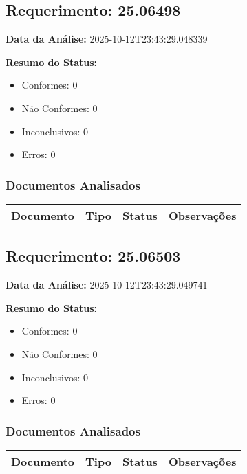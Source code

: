 \documentclass[12pt,a4paper]{article}
\begin{document}
\subsection{Requerimento: 25.06498}

\textbf{Data da Análise:} 2025-10-12T23:43:29.048339

\textbf{Resumo do Status:}
\begin{itemize}
    \item Conformes: 0
    \item Não Conformes: 0
    \item Inconclusivos: 0
    \item Erros: 0
\end{itemize}

\subsubsection{Documentos Analisados}

\begin{longtable}{|p{4cm}|p{2cm}|p{2cm}|p{6cm}|}
\hline
\textbf{Documento} & \textbf{Tipo} & \textbf{Status} & \textbf{Observações} \\
\hline
\endhead
\end{longtable}


\subsection{Requerimento: 25.06503}

\textbf{Data da Análise:} 2025-10-12T23:43:29.049741

\textbf{Resumo do Status:}
\begin{itemize}
    \item Conformes: 0
    \item Não Conformes: 0
    \item Inconclusivos: 0
    \item Erros: 0
\end{itemize}

\subsubsection{Documentos Analisados}

\begin{longtable}{|p{4cm}|p{2cm}|p{2cm}|p{6cm}|}
\hline
\textbf{Documento} & \textbf{Tipo} & \textbf{Status} & \textbf{Observações} \\
\hline
\endhead
\end{longtable}
\end{document}
